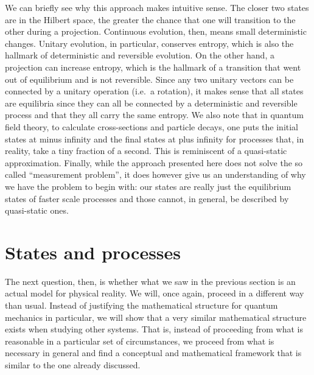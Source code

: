 \documentclass[11pt]{article}
\begin{document}
We can briefly see why this approach makes intuitive sense. The closer two states are in the Hilbert space, the greater the chance that one will transition to the other during a projection. Continuous evolution, then, means small deterministic changes. Unitary evolution, in particular, conserves entropy, which is also the hallmark of deterministic and reversible evolution. On the other hand, a projection can increase entropy, which is the hallmark of a transition that went out of equilibrium and is not reversible. Since any two unitary vectors can be connected by a unitary operation (i.e.~a rotation), it makes sense that all states are equilibria since they can all be connected by a deterministic and reversible process and that they all carry the same entropy. We also note that in quantum field theory, to calculate cross-sections and particle decays, one puts the initial states at minus infinity and the final states at plus infinity for processes that, in reality, take a tiny fraction of a second. This is reminiscent of a quasi-static approximation. Finally, while the approach presented here does not solve the so called ``measurement problem'', it does however give us an understanding of why we have the problem to begin with: our states are really just the equilibrium states of faster scale processes and those cannot, in general, be described by quasi-static ones.


\section{States and processes}

The next question, then, is whether what we saw in the previous section is an actual model for physical reality. We will, once again, proceed in a different way than usual. Instead of justifying the mathematical structure for quantum mechanics in particular, we will show that a very similar mathematical structure exists when studying other systems. That is, instead of proceeding from what is reasonable in a particular set of circumstances, we proceed from what is necessary in general and find a conceptual and mathematical framework that is similar to the one already discussed.
\end{document}

